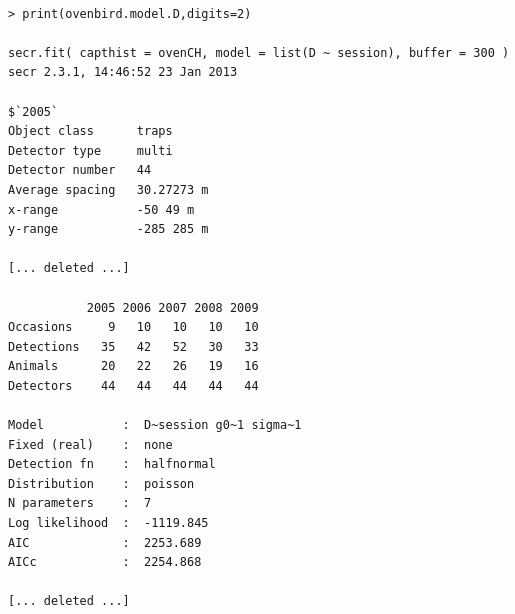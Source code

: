 {\small
\begin{verbatim}

> print(ovenbird.model.D,digits=2)

secr.fit( capthist = ovenCH, model = list(D ~ session), buffer = 300 )
secr 2.3.1, 14:46:52 23 Jan 2013

$`2005`
Object class      traps 
Detector type     multi 
Detector number   44 
Average spacing   30.27273 m 
x-range           -50 49 m 
y-range           -285 285 m 

[... deleted ...]

           2005 2006 2007 2008 2009
Occasions     9   10   10   10   10
Detections   35   42   52   30   33
Animals      20   22   26   19   16
Detectors    44   44   44   44   44

Model           :  D~session g0~1 sigma~1 
Fixed (real)    :  none 
Detection fn    :  halfnormal 
Distribution    :  poisson 
N parameters    :  7 
Log likelihood  :  -1119.845 
AIC             :  2253.689 
AICc            :  2254.868 

[... deleted ...]
\end{verbatim}
}


